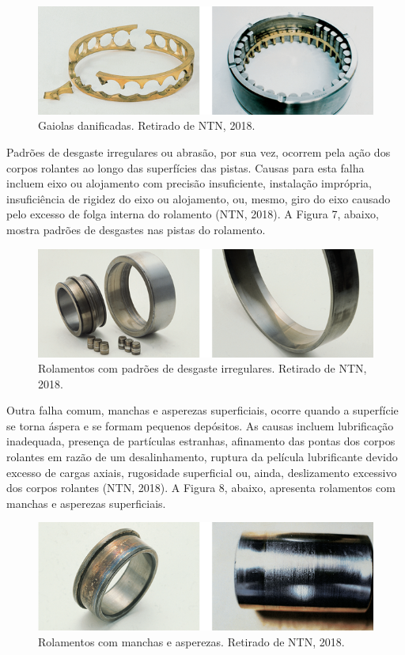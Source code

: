 \documentclass[
	12pt,				
	oneside,			
	a4paper,			
	english,			
	brazil				
	]{abntex2ppgsi}
\begin{document}
\begin{figure}[!htb]
\centering
\includegraphics{Figura6}
\caption {Gaiolas danificadas. Retirado de NTN, 2018.}
\label{Figura6}
\end{figure}

Padrões de desgaste irregulares ou abrasão, por sua vez, ocorrem pela ação dos corpos rolantes ao longo das superfícies das pistas. Causas para esta falha incluem eixo ou alojamento com precisão insuficiente, instalação imprópria, insuficiência de rigidez do eixo ou alojamento, ou, mesmo, giro do eixo causado pelo excesso de folga interna do rolamento (NTN, 2018). A Figura 7, abaixo, mostra padrões de desgastes nas pistas do rolamento.

\begin{figure}[!htb]
\centering
\includegraphics{Figura7}
\caption {Rolamentos com padrões de desgaste irregulares. Retirado de NTN, 2018.}
\label{Figura7}
\end{figure}

Outra falha comum, manchas e asperezas superficiais, ocorre quando a superfície se torna áspera e se formam pequenos depósitos. As causas incluem lubrificação inadequada, presença de partículas estranhas, afinamento das pontas dos corpos rolantes em razão de um desalinhamento, ruptura da película lubrificante devido excesso de cargas axiais, rugosidade superficial ou, ainda, deslizamento excessivo dos corpos rolantes (NTN, 2018). A Figura 8, abaixo, apresenta rolamentos com manchas e asperezas superficiais.

\begin{figure}[!htb]
\centering
\includegraphics{Figura8}
\caption {Rolamentos com manchas e asperezas. Retirado de NTN, 2018.}
\label{Figura8}
\end{figure}
\end{document}
